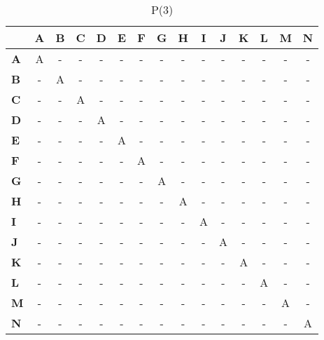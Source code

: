 \documentclass{article}
\begin{document}
\begin{table}[H]\centering
\caption{P(3)}
\begin{tabular}{l c c c c c c c c c c c c c c}
\toprule
 & \textbf{A} & \textbf{B} & \textbf{C} & \textbf{D} & \textbf{E} & \textbf{F} & \textbf{G} & \textbf{H} & \textbf{I} & \textbf{J} & \textbf{K} & \textbf{L} & \textbf{M} & \textbf{N}\\\midrule
\textbf{A} & A & - & - & - & - & - & - & - & - & - & - & - & - & - \\
\textbf{B} & - & A & - & - & - & - & - & - & - & - & - & - & - & - \\
\textbf{C} & - & - & A & - & - & - & - & - & - & - & - & - & - & - \\
\textbf{D} & - & - & - & A & - & - & - & - & - & - & - & - & - & - \\
\textbf{E} & - & - & - & - & A & - & - & - & - & - & - & - & - & - \\
\textbf{F} & - & - & - & - & - & A & - & - & - & - & - & - & - & - \\
\textbf{G} & - & - & - & - & - & - & A & - & - & - & - & - & - & - \\
\textbf{H} & - & - & - & - & - & - & - & A & - & - & - & - & - & - \\
\textbf{I} & - & - & - & - & - & - & - & - & A & - & - & - & - & - \\
\textbf{J} & - & - & - & - & - & - & - & - & - & A & - & - & - & - \\
\textbf{K} & - & - & - & - & - & - & - & - & - & - & A & - & - & - \\
\textbf{L} & - & - & - & - & - & - & - & - & - & - & - & A & - & - \\
\textbf{M} & - & - & - & - & - & - & - & - & - & - & - & - & A & - \\
\textbf{N} & - & - & - & - & - & - & - & - & - & - & - & - & - & A \\
\bottomrule
\end{tabular}
\end{table}
\end{document}
